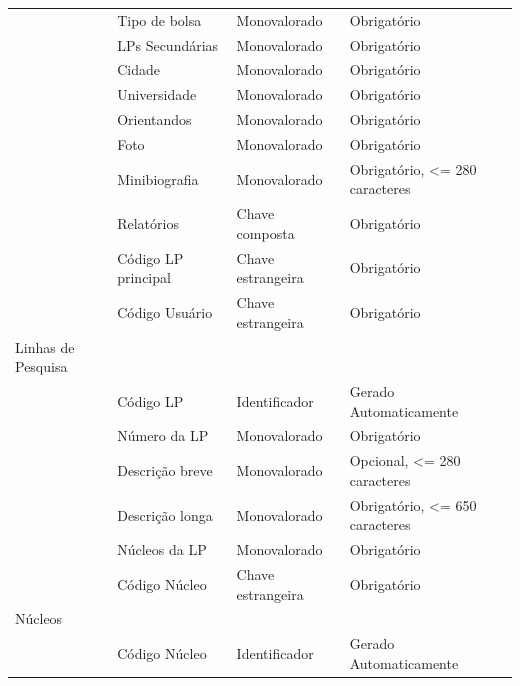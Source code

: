 \documentclass[11pt]{../../classes/ifscarticle}
\begin{document}
\begin{table}[h]
\begin{tabular}{l|l|l|l|}
                  & Tipo de bolsa       & Monovalorado      & Obrigatório                                          \\
                  & LPs Secundárias     & Monovalorado      & Obrigatório                                          \\
                  & Cidade              & Monovalorado      & Obrigatório                                          \\
                  & Universidade        & Monovalorado      & Obrigatório                                          \\
                  & Orientandos         & Monovalorado      & Obrigatório                                          \\
                  & Foto                & Monovalorado      & Obrigatório                                          \\
                  & Minibiografia       & Monovalorado      & Obrigatório, <= 280 caracteres                       \\
                  & Relatórios          & Chave composta    & Obrigatório                                          \\
                  & Código LP principal & Chave estrangeira & Obrigatório                                          \\
                  & Código Usuário      & Chave estrangeira & Obrigatório                                          \\
    \hline
    Linhas de Pesquisa \\
                  & Código LP       & Identificador     & Gerado Automaticamente         \\
                  & Número da LP    & Monovalorado      & Obrigatório                    \\
                  & Descrição breve & Monovalorado      & Opcional, <= 280 caracteres    \\
                  & Descrição longa & Monovalorado      & Obrigatório, <= 650 caracteres \\
                  & Núcleos da LP   & Monovalorado      & Obrigatório                    \\
                  & Código Núcleo   & Chave estrangeira & Obrigatório                    \\
    \hline
    Núcleos \\
                  & Código Núcleo       & Identificador     & Gerado Automaticamente         \\

\end{tabular}
\end{table}
\end{document}
